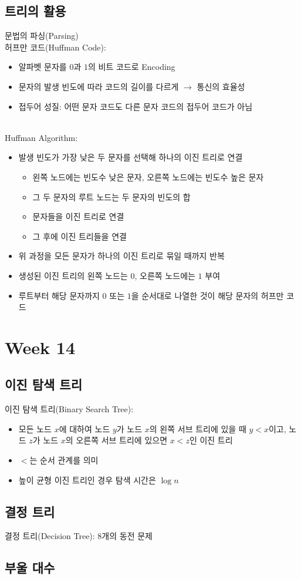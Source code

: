 \subsection{트리의 활용}
문법의 파싱(Parsing)\\
허프만 코드(Huffman Code):
\begin{itemize}
    \item 알파벳 문자를 $0$과 $1$의 비트 코드로 Encoding
    \item 문자의 발생 빈도에 따라 코드의 길이를 다르게 $\to$ 통신의 효율성
    \item 접두어 성질: 어떤 문자 코드도 다른 문자 코드의 접두어 코드가 아님
\end{itemize}\phantom{}\\
Huffman Algorithm:
\begin{itemize}
    \item 발생 빈도가 가장 낮은 두 문자를 선택해 하나의 이진 트리로 연결
    \begin{itemize}
        \item 왼쪽 노드에는 빈도수 낮은 문자, 오른쪽 노드에는 빈도수 높은 문자
        \item 그 두 문자의 루트 노드는 두 문자의 빈도의 합
        \item 문자들을 이진 트리로 연결
        \item 그 후에 이진 트리들을 연결
    \end{itemize}
    \item 위 과정을 모든 문자가 하나의 이진 트리로 묶일 때까지 반복
    \item 생성된 이진 트리의 왼쪽 노드는 $0$, 오른쪽 노드에는 $1$ 부여
    \item 루트부터 해당 문자까지 $0$ 또는 $1$을 순서대로 나열한 것이 해당 문자의 허프만 코드 
\end{itemize}

\newpage 
\section{Week 14}
\subsection{이진 탐색 트리}
이진 탐색 트리(Binary Search Tree):
\begin{itemize}
    \item 모든 노드 $x$에 대하여 노드 $y$가 노드 $x$의 왼쪽 서브 트리에 있을 때 $y < x$이고,
    노드 $z$가 노드 $x$의 오른쪽 서브 트리에 있으면 $x < z$인 이진 트리
    \item $<$는 순서 관계를 의미
    \item 높이 균형 이진 트리인 경우 탐색 시간은 $\log n$
\end{itemize}

\subsection{결정 트리}
결정 트리(Decision Tree): 8개의 동전 문제

\subsection{부울 대수}


